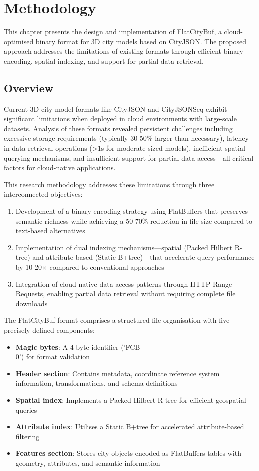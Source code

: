 \chapter{Methodology}

This chapter presents the design and implementation of FlatCityBuf, a cloud-optimised binary format for 3D city models based on CityJSON. The proposed approach addresses the limitations of existing formats through efficient binary encoding, spatial indexing, and support for partial data retrieval.

\section{Overview}

Current 3D city model formats like CityJSON and CityJSONSeq exhibit significant limitations when deployed in cloud environments with large-scale datasets. Analysis of these formats revealed persistent challenges including excessive storage requirements (typically 30-50\% larger than necessary), latency in data retrieval operations (>1s for moderate-sized models), inefficient spatial querying mechanisms, and insufficient support for partial data access—all critical factors for cloud-native applications.

This research methodology addresses these limitations through three interconnected objectives:

\begin{enumerate}
    \item Development of a binary encoding strategy using FlatBuffers that preserves semantic richness while achieving a 50-70\% reduction in file size compared to text-based alternatives
    \item Implementation of dual indexing mechanisms—spatial (Packed Hilbert R-tree) and attribute-based (Static B+tree)—that accelerate query performance by 10-20× compared to conventional approaches
    \item Integration of cloud-native data access patterns through HTTP Range Requests, enabling partial data retrieval without requiring complete file downloads
\end{enumerate}

The FlatCityBuf format comprises a structured file organisation with five precisely defined components:

\begin{itemize}
    \item \textbf{Magic bytes}: A 4-byte identifier ('FCB\\0') for format validation
    \item \textbf{Header section}: Contains metadata, coordinate reference system information, transformations, and schema definitions
    \item \textbf{Spatial index}: Implements a Packed Hilbert R-tree for efficient geospatial queries
    \item \textbf{Attribute index}: Utilises a Static B+tree for accelerated attribute-based filtering
    \item \textbf{Features section}: Stores city objects encoded as FlatBuffers tables with geometry, attributes, and semantic information
\end{itemize}

